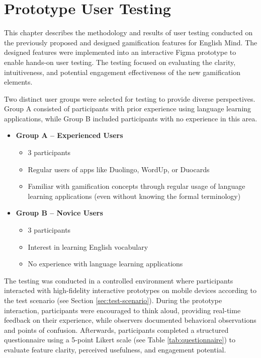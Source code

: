 \chapter{Prototype User Testing}
\label{chap:prototype-user-testing}

This chapter describes the methodology and results of user testing conducted on the previously proposed and designed gamification features for English Mind. The designed features were implemented into an interactive Figma \cite{cite:figma} prototype to enable hands-on user testing. The testing focused on evaluating the clarity, intuitiveness, and potential engagement effectiveness of the new gamification elements.

Two distinct user groups were selected for testing to provide diverse perspectives. Group A consisted of participants with prior experience using language learning applications, while Group B included participants with no experience in this area.
\begin{itemize}
    \item \textbf{Group A – Experienced Users}
    \begin{itemize}
        \item 3 participants
        \item Regular users of apps like Duolingo, WordUp, or Duocards
        \item Familiar with gamification concepts through regular usage of language learning applications (even without knowing the formal terminology)
    \end{itemize}

    \item \textbf{Group B – Novice Users}
    \begin{itemize}
        \item 3 participants
        \item Interest in learning English vocabulary
        \item No experience with language learning applications
    \end{itemize}
\end{itemize}

The testing was conducted in a controlled environment where participants interacted with high-fidelity interactive prototypes on mobile devices according to the test scenario (see Section \ref{sec:test-scenario}). During the prototype interaction, participants were encouraged to think aloud, providing real-time feedback on their experience, while observers documented behavioral observations and points of confusion. Afterwards, participants completed a structured questionnaire using a 5-point Likert scale (see Table \ref{tab:questionnaire}) to evaluate feature clarity, perceived usefulness, and engagement potential.

